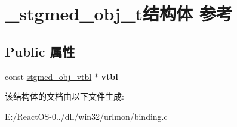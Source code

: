 \hypertarget{struct__stgmed__obj__t}{}\section{\+\_\+stgmed\+\_\+obj\+\_\+t结构体 参考}
\label{struct__stgmed__obj__t}
\subsection*{Public 属性}
\begin{DoxyCompactItemize}
\item 
\mbox{\label{struct__stgmed__obj__t_a86f62a07ef9f3f40c6262f1d47c361a6}} 
const \hyperlink{structstgmed__obj__vtbl}{stgmed\+\_\+obj\+\_\+vtbl} $\ast$ {\bfseries vtbl}
\end{DoxyCompactItemize}


该结构体的文档由以下文件生成\+:\begin{DoxyCompactItemize}
\item 
E\+:/\+React\+O\+S-\/0../dll/win32/urlmon/binding.\+c\end{DoxyCompactItemize}
